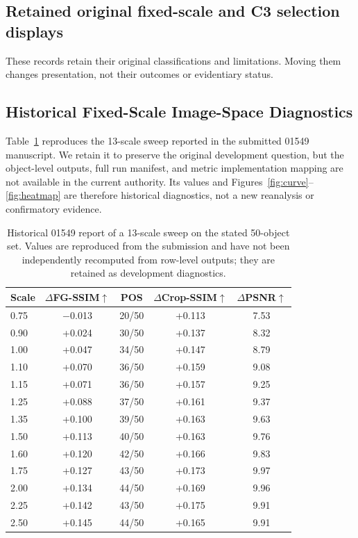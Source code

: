 \documentclass[11pt]{article}
\begin{document}
\clearpage

\subsection*{Retained original fixed-scale and C3 selection displays}
These records retain their original classifications and limitations. Moving them changes presentation, not their outcomes or evidentiary status.

\subsection*{Historical Fixed-Scale Image-Space Diagnostics}
\label{subsec:tradeoff}

Table~\ref{tab:sweep} reproduces the 13-scale sweep reported in the submitted 01549 manuscript. We retain it to preserve the original development question, but the object-level outputs, full run manifest, and metric implementation mapping are not available in the current authority. Its values and Figures~\ref{fig:curve}--\ref{fig:heatmap} are therefore historical diagnostics, not a new reanalysis or confirmatory evidence.

\begin{table}[t]
\centering
\caption{Historical 01549 report of a 13-scale sweep on the stated 50-object set. Values are reproduced from the submission and have not been independently recomputed from row-level outputs; they are retained as development diagnostics.}
\label{tab:sweep}
\small
\begin{tabular}{lcccc}
\toprule
Scale & $\Delta$FG-SSIM$\uparrow$ & POS & $\Delta$Crop-SSIM$\uparrow$ & $\Delta$PSNR$\uparrow$ \\
\midrule
0.75 & $-$0.013 & 20/50 & +0.113 & 7.53 \\
0.90 & +0.024 & 30/50 & +0.137 & 8.32 \\
1.00 & +0.047 & 34/50 & +0.147 & 8.79 \\
1.10 & +0.070 & 36/50 & +0.159 & 9.08 \\
1.15 & +0.071 & 36/50 & +0.157 & 9.25 \\
1.25 & +0.088 & 37/50 & +0.161 & 9.37 \\
1.35 & +0.100 & 39/50 & +0.163 & 9.63 \\
1.50 & +0.113 & 40/50 & +0.163 & 9.76 \\
1.60 & +0.120 & 42/50 & +0.166 & 9.83 \\
1.75 & +0.127 & 43/50 & +0.173 & 9.97 \\
2.00 & +0.134 & 44/50 & +0.169 & 9.96 \\
2.25 & +0.142 & 43/50 & +0.175 & 9.91 \\
2.50 & +0.145 & 44/50 & +0.165 & 9.91 \\
\bottomrule
\end{tabular}
\end{table}
\end{document}
